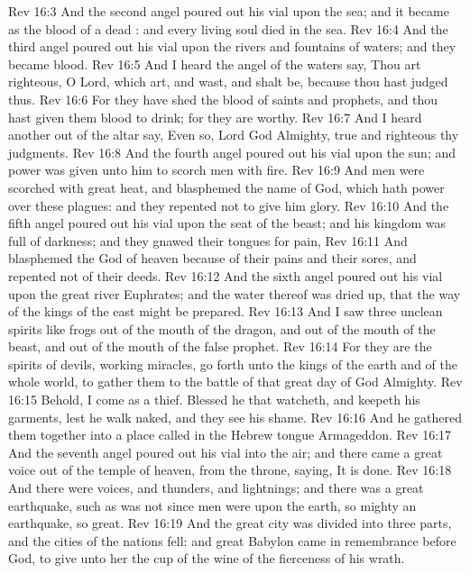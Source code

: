 \vs Rev 16:3 And the second angel poured out his vial upon the sea; and it became as the blood of a dead : and every living soul died in the sea.
\vs Rev 16:4 And the third angel poured out his vial upon the rivers and fountains of waters; and they became blood.
\vs Rev 16:5 And I heard the angel of the waters say, Thou art righteous, O Lord, which art, and wast, and shalt be, because thou hast judged thus.
\vs Rev 16:6 For they have shed the blood of saints and prophets, and thou hast given them blood to drink; for they are worthy.
\vs Rev 16:7 And I heard another out of the altar say, Even so, Lord God Almighty, true and righteous  thy judgments.
\vs Rev 16:8 And the fourth angel poured out his vial upon the sun; and power was given unto him to scorch men with fire.
\vs Rev 16:9 And men were scorched with great heat, and blasphemed the name of God, which hath power over these plagues: and they repented not to give him glory.
\vs Rev 16:10 And the fifth angel poured out his vial upon the seat of the beast; and his kingdom was full of darkness; and they gnawed their tongues for pain,
\vs Rev 16:11 And blasphemed the God of heaven because of their pains and their sores, and repented not of their deeds.
\vs Rev 16:12 And the sixth angel poured out his vial upon the great river Euphrates; and the water thereof was dried up, that the way of the kings of the east might be prepared.
\vs Rev 16:13 And I saw three unclean spirits like frogs  out of the mouth of the dragon, and out of the mouth of the beast, and out of the mouth of the false prophet.
\vs Rev 16:14 For they are the spirits of devils, working miracles,  go forth unto the kings of the earth and of the whole world, to gather them to the battle of that great day of God Almighty.
\vs Rev 16:15 Behold, I come as a thief. Blessed  he that watcheth, and keepeth his garments, lest he walk naked, and they see his shame.
\vs Rev 16:16 And he gathered them together into a place called in the Hebrew tongue Armageddon.
\vs Rev 16:17 And the seventh angel poured out his vial into the air; and there came a great voice out of the temple of heaven, from the throne, saying, It is done.
\vs Rev 16:18 And there were voices, and thunders, and lightnings; and there was a great earthquake, such as was not since men were upon the earth, so mighty an earthquake,  so great.
\vs Rev 16:19 And the great city was divided into three parts, and the cities of the nations fell: and great Babylon came in remembrance before God, to give unto her the cup of the wine of the fierceness of his wrath.
